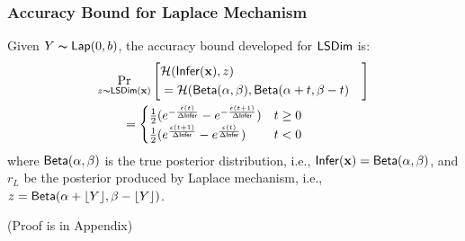 \documentclass{article}
\begin{document}
\subsubsection{Accuracy Bound for Laplace Mechanism}
\label{subsec_accuracy_lap}
\begin{lem}
\label{lem_acc_lap}
Given $Y \thicksim \mathsf{Lap}(0, b)$, the accuracy bound developed for $\mathsf{LSDim}$ is:
\begin{align*}
&
\lapmechPr{\dataobs}{
\begin{aligned}
\lefteqn{\hellinger(\bysinfer(\dataobs), z )}\\ 
&= \hellinger(\betad(\alpha, \beta), \betad(\alpha + t, \beta - t)
\end{aligned}
}
\\
&\qquad = 
\begin{cases}
\frac{1}{2} (e^{- \frac{\epsilon (t)}{\Delta \bysinfer}} - e^{- \frac{\epsilon (t + 1)}{\Delta \bysinfer}}) &  t \geq 0\\
\frac{1}{2} (e^{\frac{\epsilon (t + 1)}{\Delta \bysinfer}} - e^{\frac{\epsilon (t)}{\Delta \bysinfer}}) & t < 0
\end{cases}
\end{align*}
where $\mathsf{Beta}(\alpha, \beta)$ is the true posterior distribution, i.e., $\mathsf{Infer}(\textbf{x}) = \mathsf{Beta}(\alpha, \beta)$, and $r_L$ be the posterior produced by Laplace mechanism, i.e., $z = \mathsf{Beta}(\alpha + \lfloor Y \rfloor, \beta - \lfloor Y \rfloor)$.
\end{lem}
(Proof is in Appendix)
\end{document}
